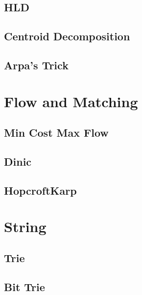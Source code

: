 \section{HLD}


\section{Centroid Decomposition}


\section{Arpa's Trick}


\chapter{Flow and Matching}
\section{Min Cost Max Flow}


\section{Dinic}


\section{HopcroftKarp}


\chapter{String}
\section{Trie}


\section{Bit Trie}



